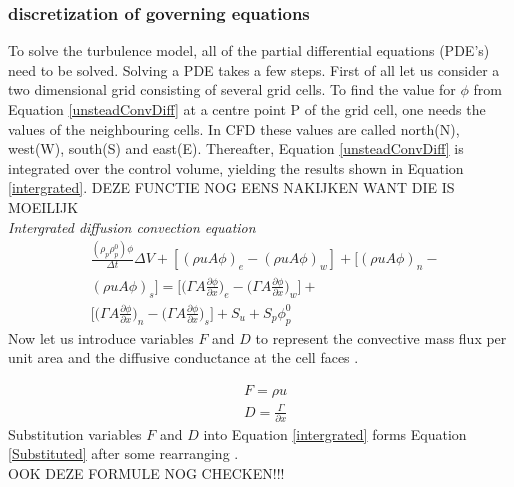 \documentclass{CFD2017}
\begin{document}
\subsubsection{discretization of governing equations}
To solve the turbulence model, all of the partial differential equations (PDE's) need to be solved. Solving a PDE takes a few steps. First of all let us consider a two dimensional grid consisting of several grid cells. To find the value for $\phi$ from Equation \ref{unsteadConvDiff} at a centre point P of the grid cell, one needs the values of the neighbouring cells. In CFD these values are called north(N), west(W), south(S) and east(E). Thereafter, Equation \ref{unsteadConvDiff} is integrated over the control volume, yielding the results shown in Equation \ref{intergrated}.\vspace{2mm}
DEZE FUNCTIE NOG EENS NAKIJKEN WANT DIE IS MOEILIJK\\
\emph{Intergrated diffusion convection equation}
\begin{equation}
\begin{split}
\label{intergrated}
&\frac{(\rho_p \rho_p^0)\phi}{\Delta t}\Delta V +[(\rho u A \phi)_e -(\rho u A \phi)_w]+[(\rho u A \phi)_n -\\
&(\rho u A \phi)_s]=\bigg[\bigg(\Gamma A \frac{\partial \phi}{\partial x}\bigg)_e -\bigg(\Gamma A \frac{\partial \phi}{\partial x}\bigg)_w\bigg] +\\
&\bigg[\bigg(\Gamma A \frac{\partial \phi}{\partial x}\bigg)_n -\bigg(\Gamma A \frac{\partial \phi}{\partial x}\bigg)_s\bigg] + S_u + S_p\phi_p^0
\end{split}
\end{equation}
Now let us introduce variables $F$ and $D$ to represent the convective mass flux per unit area and the diffusive conductance at the cell faces \cite{Versteeg2007}.\vspace{2mm}

\begin{align}
&F = \rho u\\
&D=\frac{\Gamma}{\partial x}
\end{align}
Substitution variables $F$ and $D$ into Equation \ref{intergrated} forms Equation \ref{Substituted} after some rearranging \cite{Versteeg2007}. \\OOK DEZE FORMULE NOG CHECKEN!!!
\end{document}

